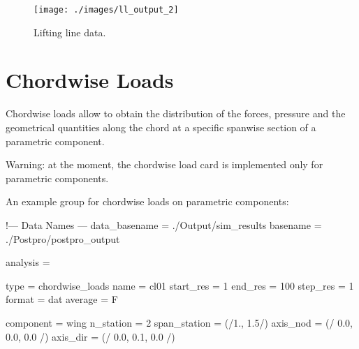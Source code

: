 
\begin{figure}[h]
\centering
\texttt{[image: ./images/ll\_output\_2]} 
\caption{Lifting line data.}
\label{fig:ll_output}
\end{figure}

\section{Chordwise Loads} 
Chordwise loads allow to obtain the distribution of the forces, pressure and the geometrical
quantities along the chord at a specific spanwise section of a parametric component. 

Warning: at the moment, the chordwise load card is implemented only for parametric components. 

An example  group for chordwise loads on parametric components:

\begin{inputfile}[frame=single, caption={dust\_post.in for chordwise load 
  on parametric components}, label={file:dust_post.in_chordwise_param}]
!--- Data Names ---
data_basename = ./Output/sim_results
basename =     ./Postpro/postpro_output

analysis = {

  type = chordwise_loads
  name = cl01
  start_res = 1
  end_res = 100
  step_res = 1
  format = dat
  average = F
  
  component = wing
  n_station  = 2
  span_station = (/1., 1.5/) 
  axis_nod = (/ 0.0, 0.0, 0.0 /)
  axis_dir = (/ 0.0, 0.1, 0.0 /)

}
\end{inputfile}

